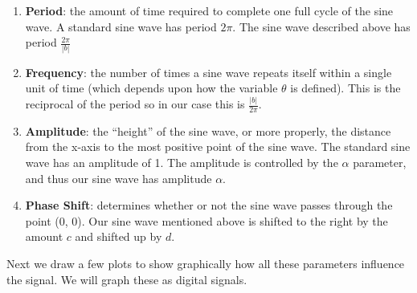 \documentclass[
]{krantz}
\providecommand{\tightlist}{%
  \setlength{\itemsep}{0pt}\setlength{\parskip}{0pt}}
\begin{document}
\begin{enumerate}
\def\labelenumi{\arabic{enumi}.}
\tightlist
\item
  \textbf{Period}: the amount of time required to complete one full cycle of the sine wave. A standard sine wave has period \(2\pi\). The sine wave described above has period \(\frac{2\pi}{|b|}\)
\item
  \textbf{Frequency}: the number of times a sine wave repeats itself within a single unit of time (which depends upon how the variable \(\theta\) is defined). This is the reciprocal of the period so in our case this is \(\frac{|b|}{2\pi}\).
\item
  \textbf{Amplitude}: the ``height'' of the sine wave, or more properly, the distance from the x-axis to the most positive point of the sine wave. The standard sine wave has an amplitude of 1. The amplitude is controlled by the \(\alpha\) parameter, and thus our sine wave has amplitude \(\alpha\).
\item
  \textbf{Phase Shift}: determines whether or not the sine wave passes through the point (0, 0). Our sine wave mentioned above is shifted to the right by the amount \(c\) and shifted up by \(d\).
\end{enumerate}

Next we draw a few plots to show graphically how all these parameters influence the signal. We will graph these as digital signals.
\end{document}
